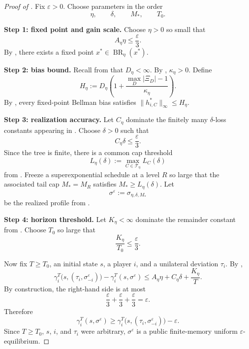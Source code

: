 \documentclass[12pt]{article}
\theoremstyle{definition}
\newcommand{\eps}{\varepsilon}
\newcommand{\1}{\mathbf{1}}
\newcommand{\cT}{\mathcal{T}}
\DeclareMathOperator{\BR}{BR}
\begin{document}
\begin{proof}[Proof of ]
Fix $\eps>0$. Choose parameters in the order
\[
\eta,\qquad \delta,\qquad M_*,\qquad T_0.
\]

\smallskip
\noindent\textbf{Step 1: fixed point and gain scale.}
Choose $\eta>0$ so small that
\[
A_\eta\eta\le \frac{\eps}{3}.
\]
By , there exists a fixed point $x^*\in\BR_\eta(x^*)$.

\smallskip
\noindent\textbf{Step 2: bias bound.}
Recall from  that $D_\eta<\infty$. By
, $\kappa_\eta>0$. Define
\[
H_\eta:=D_\eta\left(1+\frac{\max_D|\Xi_D|-1}{\kappa_\eta}\right).
\]
By , every fixed-point Bellman bias satisfies
$\|h_{i,C}^*\|_\infty\le H_\eta$.

\smallskip
\noindent\textbf{Step 3: realization accuracy.}
Let $C_\eta$ dominate the finitely many $\delta$-loss constants appearing in
. Choose
$\delta>0$ such that
\[
C_\eta\delta\le \frac{\eps}{3}.
\]
Since the tree is finite, there is a common cap threshold
\[
L_\eta(\delta):=\max_{C\in\cT_\eta}L_C(\delta)
\]
from . Freeze a superexponential schedule at a level
$R$ so large that the associated tail cap $M_*=M_R$ satisfies
$M_*\ge L_\eta(\delta)$. Let
\[
\sigma^\eps:=\sigma_{\eta,\delta,M_*}
\]
be the realized profile from .

\smallskip
\noindent\textbf{Step 4: horizon threshold.}
Let $K_\eta<\infty$ dominate the remainder constant from
. Choose $T_0$ so large that
\[
\frac{K_\eta}{T_0}\le \frac{\eps}{3}.
\]

Now fix $T\ge T_0$, an initial state $s$, a player $i$, and a unilateral
deviation $\tau_i$. By ,
\begin{equation}
\label{eq:direct-tail-comparison-proof}
\gamma_i^T\bigl(s,(\tau_i,\sigma^\eps_{-i})\bigr)
-
\gamma_i^T(s,\sigma^\eps)
\le
A_\eta\eta + C_\eta\delta + \frac{K_\eta}{T}.
\end{equation}
By construction, the right-hand side is at most
\[
\frac{\eps}{3}+\frac{\eps}{3}+\frac{\eps}{3}=\eps.
\]
Therefore
\[
\gamma_i^T(s,\sigma^\eps)
\ge
\gamma_i^T\bigl(s,(\tau_i,\sigma^\eps_{-i})\bigr)-\eps.
\]
Since $T\ge T_0$, $s$, $i$, and $\tau_i$ were arbitrary, $\sigma^\eps$ is a
public finite-memory uniform $\eps$-equilibrium.
\end{proof}
\end{document}
